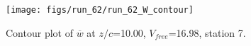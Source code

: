 \begin{figure}[H]
\centering
\texttt{[image: figs/run\_62/run\_62\_W\_contour]}
\caption{Contour plot of $\overline{w}$ at $z/c$=10.00, $V_{free}$=16.98, station 7.}
\label{fig:run_62_W_contour}
\end{figure}


